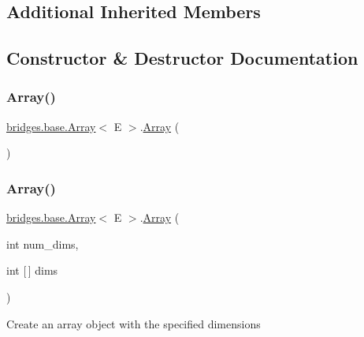 \subsection*{Additional Inherited Members}


\subsection{Constructor \& Destructor Documentation}
\mbox{\label{classbridges_1_1base_1_1_array_ad5dbf7bbd9811c2dac16a5c135465d4b}} 
\subsubsection{\texorpdfstring{Array()}{Array()}\hspace{0.1cm}{\footnotesize\ttfamily [1/2]}}
{\footnotesize\ttfamily \mbox{\hyperlink{classbridges_1_1base_1_1_array}{bridges.\+base.\+Array}}$<$ E $>$.\mbox{\hyperlink{classbridges_1_1base_1_1_array}{Array}} (\begin{DoxyParamCaption}{ }\end{DoxyParamCaption})}

\mbox{\label{classbridges_1_1base_1_1_array_ab37dbe6efe0c34242456971e430763f7}} 
\subsubsection{\texorpdfstring{Array()}{Array()}\hspace{0.1cm}{\footnotesize\ttfamily [2/2]}}
{\footnotesize\ttfamily \mbox{\hyperlink{classbridges_1_1base_1_1_array}{bridges.\+base.\+Array}}$<$ E $>$.\mbox{\hyperlink{classbridges_1_1base_1_1_array}{Array}} (\begin{DoxyParamCaption}\item[{int}]{num\+\_\+dims,  }\item[{int \mbox{[}$\,$\mbox{]}}]{dims }\end{DoxyParamCaption})}

Create an array object with the specified dimensions


